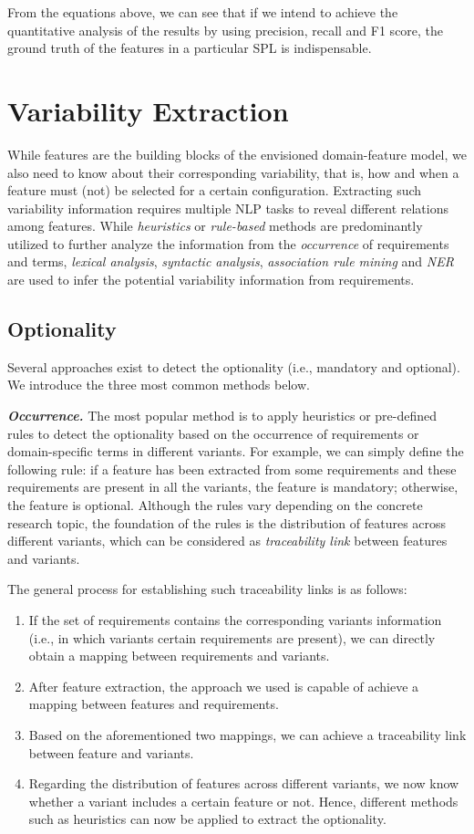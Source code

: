 \documentclass[graybox]{svmult}
\begin{document}
From the equations above, we can see that if we intend to achieve the quantitative analysis of the results by using precision, recall and F1 score, the ground truth of the features in a particular SPL is indispensable.


\section{Variability Extraction}
\label{sec:variability}
While features are the building blocks of the envisioned domain-feature model, we also need to know about their corresponding variability, that is, how and when a feature must (not) be selected for a certain configuration.
Extracting such variability information requires multiple NLP tasks to reveal different relations among features. 
While \textit{heuristics} or \textit{rule-based} methods are predominantly utilized to further analyze the information from the \textit{occurrence} of requirements and terms, \textit{lexical analysis}, \textit{syntactic analysis}, \textit{association rule mining} and \textit{NER} are used to infer the potential variability information from requirements.

\subsection{Optionality}
Several approaches exist to detect the optionality (i.e., mandatory and optional). 
We introduce the three most common methods below.

\textit{\textbf{Occurrence.}} The most popular method is to apply heuristics or pre-defined rules to detect the optionality based on the occurrence of requirements or domain-specific terms in different variants. 
For example, we can simply define the following rule: if a feature has been extracted from some requirements and these requirements are present in all the variants, the feature is mandatory; otherwise, the feature is optional. Although the rules vary depending on the concrete research topic, the foundation of the rules is the distribution of features across different variants, which can be considered as \textit{traceability link} between features and variants.

The general process for establishing such traceability links is as follows:
\begin{enumerate}
    \item If the set of requirements contains the corresponding variants information (i.e., in which variants certain requirements are present), we can directly obtain a mapping between requirements and variants.
    \item After feature extraction, the approach we used is capable of achieve a mapping between features and requirements.
    \item Based on the aforementioned two mappings, we can achieve a traceability link between feature and variants.
    \item Regarding the distribution of features across different variants, we now know whether a variant includes a certain feature or not. Hence, different methods such as heuristics can now be applied to extract the optionality.
\end{enumerate}
\end{document}
